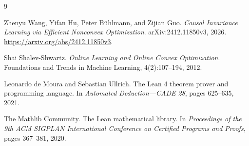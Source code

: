\begin{thebibliography}{9}

Zhenyu Wang, Yifan Hu, Peter B\"uhlmann, and Zijian Guo.
\newblock \emph{Causal Invariance Learning via Efficient Nonconvex Optimization}.
\newblock arXiv:2412.11850v3, 2026.
\newblock \url{https://arxiv.org/abs/2412.11850v3}.

Shai Shalev-Shwartz.
\newblock \emph{Online Learning and Online Convex Optimization}.
\newblock Foundations and Trends in Machine Learning, 4(2):107--194, 2012.

Leonardo de Moura and Sebastian Ullrich.
\newblock The Lean 4 theorem prover and programming language.
\newblock In \emph{Automated Deduction---CADE 28}, pages 625--635, 2021.

The Mathlib Community.
\newblock The Lean mathematical library.
\newblock In \emph{Proceedings of the 9th ACM SIGPLAN International Conference
on Certified Programs and Proofs}, pages 367--381, 2020.

\end{thebibliography}
